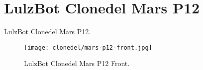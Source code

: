 %
%
%
%
%

\section{LulzBot Clonedel Mars P12}
LulzBot Clonedel Mars P12.

\begin{figure}[h!]
\texttt{[image: clonedel/mars-p12-front.jpg]}
 \caption{LulzBot Clonedel Mars P12 Front.}
 \label{fig:clonedel-mars-p12-front}
\end{figure}


